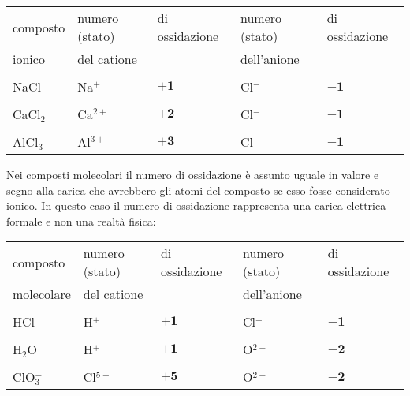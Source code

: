 \begin{center}
  \begin{tabular}{|l|ll|ll|}
    \hline
    composto & numero (stato) & \hspace{-0.4cm} di ossidazione & numero (stato) & \hspace{-0.4cm} di ossidazione\\
    ionico & del catione & & dell'anione & \\
    \hline
    &&&&\\[-0.4cm]
    NaCl & \hspace{1cm}Na$^+$ & $\boldsymbol{+1}$ & \hspace{1cm}Cl$^-$ & $\boldsymbol{-1}$\\
    \hline
    &&&&\\[-0.4cm]
    CaCl$_2$ & \hspace{1cm}Ca$^{2+}$ & $\boldsymbol{+2}$ & \hspace{1cm}Cl$^-$ & $\boldsymbol{-1}$\\
    \hline
    &&&&\\[-0.4cm]
    AlCl$_3$ & \hspace{1cm}Al$^{3+}$ & $\boldsymbol{+3}$ & \hspace{1cm}Cl$^-$ & $\boldsymbol{-1}$\\
    \hline
  \end{tabular}
\end{center}

Nei composti molecolari il numero di ossidazione è assunto uguale in valore e segno alla carica che avrebbero gli atomi del composto se esso fosse considerato ionico.
In questo caso il numero di ossidazione rappresenta una carica elettrica
formale e non una realtà fisica:

\begin{center}
  \begin{tabular}{|l|ll|ll|}
    \hline
    composto & numero (stato) & \hspace{-0.4cm} di ossidazione & numero (stato) & \hspace{-0.4cm} di ossidazione\\
    molecolare & del catione & & dell'anione & \\
    \hline
    &&&&\\[-0.4cm]
    HCl & \hspace{1cm}H$^+$ & $\boldsymbol{+1}$ & \hspace{1cm}Cl$^-$ & $\boldsymbol{-1}$\\
    \hline
    &&&&\\[-0.4cm]
    H$_2$O & \hspace{1cm}H$^+$ & $\boldsymbol{+1}$ & \hspace{1cm}O$^{2-}$ & $\boldsymbol{-2}$\\
    \hline
    &&&&\\[-0.4cm]
    ClO$_3^-$ & \hspace{1cm}Cl$^{5+}$ & $\boldsymbol{+5}$ & \hspace{1cm}O$^{2-}$ & $\boldsymbol{-2}$\\
    \hline
  \end{tabular}
\end{center}

